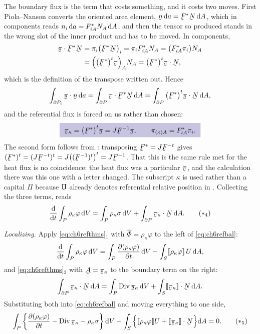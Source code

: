 \begin{solution}
The boundary flux is the term that costs something, and it costs two
moves. First Piola--Nanson  converts the oriented area
element, $\bn\,\dl a=\bF^{*}\bN\,\dl A$, which in components reads
$n_{i}\,\mathrm{d} a=F^{*}_{iA}N_{A}\,\mathrm{d} A$; and then the tensor so produced
stands in the wrong slot of the inner product and has to be moved. In
components,
\[
\begin{aligned}
   \ip{\vek\pi}{\bF^{*}\bN}
   &=\pi_{i}\big(\bF^{*}\bN\big)_{i}
    =\pi_{i}F^{*}_{iA}N_{A}
    =\big(F^{*}_{iA}\pi_{i}\big)N_{A}\\
   &=\Big(\big(\bF^{*}\big)^{t}\vek\pi\Big)_{A}N_{A}
    =\ip{\big(\bF^{*}\big)^{t}\vek\pi}{\bN} ,
\end{aligned}
\]
which is the definition of the transpose written out. Hence
\[
   \int_{\partial P_{t}}\ip{\vek\pi}\bn\,\dl a
   =\int_{\partial P}\ip{\vek\pi}{\bF^{*}\bN}\,\dl A
   =\int_{\partial P}\ip{\big(\bF^{*}\big)^{t}\vek\pi}\bN\,\dl A ,
\]
and the referential flux is forced on us rather than chosen:
\[
   \boxed{\ \vek\pi_{\kappa}=\big(\bF^{*}\big)^{t}\vek\pi
   =J\bF^{-1}\vek\pi ,
   \qquad
   \pi_{(\kappa)A}=F^{*}_{iA}\pi_{i} .\ }
\]
The second form follows from : transposing $\bF^{*}=J\bF^{-t}$
gives $(\bF^{*})^{t}=(J\bF^{-t})^{t}=J\big((\bF^{-1})^{t}\big)^{t}
=J\bF^{-1}$. That this is the same rule  met for the heat
flux is no coincidence: the heat flux was a particular $\vek\pi$, and
the calculation there was this one with a letter changed. The subscript
$\kappa$ is used rather than a capital $\Pi$ because $\vek\Pi$ already
denotes referential relative position in . Collecting the
three terms,  reads
\begin{equation}
   \frac{\dl}{\dl t}\int_{P}\rho_{\kappa}\varphi\,\dl V
   =\int_{P}\rho_{\kappa}\sigma\,\dl V
   +\int_{\partial P}\ip{\vek\pi_{\kappa}}\bN\,\dl A .
   \tag{$\ast_{4}$}\label{eq:ch6refbal}
\end{equation}

\medskip
\noindent\emph{Localizing.}
Apply \eqref{eq:ch6refthms}$_{1}$ with $\hat\Phi=\rho_{\kappa}\varphi$
to the left of \eqref{eq:ch6refbal}:
\[
   \frac{\mathrm{d}}{\mathrm{d} t}\int_{P}\rho_{\kappa}\varphi\,\mathrm{d} V
   =\int_{P}\frac{\partial(\rho_{\kappa}\varphi)}{\partial t}\,\mathrm{d} V
   -\int_{S}[\![\rho_{\kappa}\varphi]\!]\,U\,\mathrm{d} A ,
\]
and \eqref{eq:ch6refthms}$_{2}$ with $\bA=\vek\pi_{\kappa}$ to the
boundary term on the right:
\[
   \int_{\partial P}\ip{\vek\pi_{\kappa}}\bN\,\dl A
   =\int_{P}\Dvg\vek\pi_{\kappa}\,\dl V
   +\int_{S}\ip{\jump{\vek\pi_{\kappa}}}\bN\,\dl A .
\]
Substituting both into \eqref{eq:ch6refbal} and moving everything to
one side,
\begin{equation}
   \int_{P}\left\{\frac{\partial(\rho_{\kappa}\varphi)}{\partial t}
   -\Dvg\vek\pi_{\kappa}-\rho_{\kappa}\sigma\right\}\dl V
   -\int_{S}\Big\{\jump{\rho_{\kappa}\varphi}U
   +\ip{\jump{\vek\pi_{\kappa}}}\bN\Big\}\dl A=0 .
   \tag{$\ast_{5}$}\label{eq:ch6reflocal}
\end{equation}


\end{solution}
